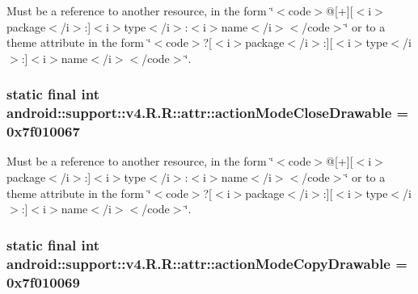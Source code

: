 Must be a reference to another resource, in the form \char`\"{}$<$code$>$@\mbox{[}+\mbox{]}\mbox{[}$<$i$>$package$<$/i$>$:\mbox{]}$<$i$>$type$<$/i$>$:$<$i$>$name$<$/i$>$$<$/code$>$\char`\"{} or to a theme attribute in the form \char`\"{}$<$code$>$?\mbox{[}$<$i$>$package$<$/i$>$:\mbox{]}\mbox{[}$<$i$>$type$<$/i$>$:\mbox{]}$<$i$>$name$<$/i$>$$<$/code$>$\char`\"{}. \hypertarget{classandroid_1_1support_1_1v4_1_1_r_1_1attr_286380d6e81458920bc75a0e73ba6ea2}{
\subsubsection[{actionModeCloseDrawable}]{\setlength{\rightskip}{0pt plus 5cm}static final int android::support::v4.R.R::attr::actionModeCloseDrawable = 0x7f010067}}
\label{classandroid_1_1support_1_1v4_1_1_r_1_1attr_286380d6e81458920bc75a0e73ba6ea2}


Must be a reference to another resource, in the form \char`\"{}$<$code$>$@\mbox{[}+\mbox{]}\mbox{[}$<$i$>$package$<$/i$>$:\mbox{]}$<$i$>$type$<$/i$>$:$<$i$>$name$<$/i$>$$<$/code$>$\char`\"{} or to a theme attribute in the form \char`\"{}$<$code$>$?\mbox{[}$<$i$>$package$<$/i$>$:\mbox{]}\mbox{[}$<$i$>$type$<$/i$>$:\mbox{]}$<$i$>$name$<$/i$>$$<$/code$>$\char`\"{}. \hypertarget{classandroid_1_1support_1_1v4_1_1_r_1_1attr_a5aae54d2504bc25d94020d1ae27111a}{
\subsubsection[{actionModeCopyDrawable}]{\setlength{\rightskip}{0pt plus 5cm}static final int android::support::v4.R.R::attr::actionModeCopyDrawable = 0x7f010069}}
\label{classandroid_1_1support_1_1v4_1_1_r_1_1attr_a5aae54d2504bc25d94020d1ae27111a}


